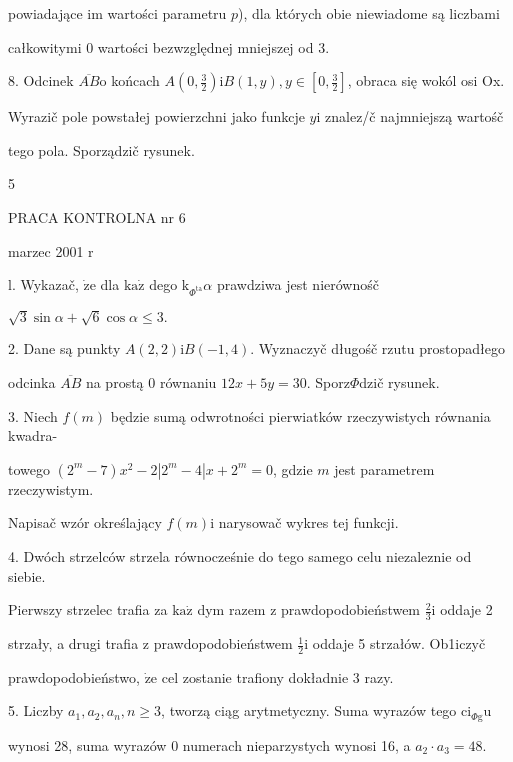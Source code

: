 \documentclass[a4paper,12pt]{article}
\begin{document}
powiadające im wartości parametru $p$), dla których obie niewiadome są liczbami

całkowitymi $0$ wartości bezwzględnej mniejszej od 3.

8. Odcinek $\overline{AB}\mathrm{o}$ końcach $A(0,\displaystyle \frac{3}{2}) \mathrm{i} B(1,y), y \in [0,\displaystyle \frac{3}{2}]$, obraca się wokól osi Ox.

Wyrazič pole powstałej powierzchni jako funkcje $y\mathrm{i}$ znalez/č najmniejszą wartośč

tego pola. Sporządzič rysunek.

5





PRACA KONTROLNA nr 6

marzec 2001 r

l. Wykazač, $\dot{\mathrm{z}}\mathrm{e}$ dla $\mathrm{k}\mathrm{a}\dot{\mathrm{z}}$ dego $\mathrm{k}_{\Phi^{\mathrm{t}\mathrm{a}}} \alpha$ prawdziwa jest nierównośč

$\sqrt{3}\sin\alpha+\sqrt{6}\cos\alpha\leq 3.$

2. Dane są punkty $A(2,2) \mathrm{i} B(-1,4)$. Wyznaczyč długośč rzutu prostopadłego

odcinka $\overline{AB}$ na prostą $0$ równaniu $12x+5y=30$. Sporz$\Phi$dzič rysunek.

3. Niech $f(m)$ będzie sumą odwrotności pierwiatków rzeczywistych równania kwadra-

towego $(2^{m}-7)x^{2}-2|2^{m}-4|x+2^{m}=0$, gdzie $m$ jest parametrem rzeczywistym.

Napisač wzór określający $f(m)\mathrm{i}$ narysowač wykres tej funkcji.

4. Dwóch strzelców strzela równocześnie do tego samego celu niezaleznie od siebie.

Pierwszy strzelec trafia za $\mathrm{k}\mathrm{a}\dot{\mathrm{z}}$ dym razem $\mathrm{z}$ prawdopodobieństwem $\displaystyle \frac{2}{3} \mathrm{i}$ oddaje 2

strzały, a drugi trafia $\mathrm{z}$ prawdopodobieństwem $\displaystyle \frac{1}{2} \mathrm{i}$ oddaje 5 strzałów. Ob1iczyč

prawdopodobieństwo, $\dot{\mathrm{z}}\mathrm{e}$ cel zostanie trafiony dokładnie 3 razy.

5. Liczby $a_{1}, a_{2}, a_{n},  n\geq 3$, tworzą ciąg arytmetyczny. Suma wyrazów tego $\mathrm{c}\mathrm{i}_{\Phi \mathrm{g}}\mathrm{u}$

wynosi 28, suma wyrazów $0$ numerach nieparzystych wynosi 16, a $a_{2}\cdot a_{3}=48.$
\end{document}
